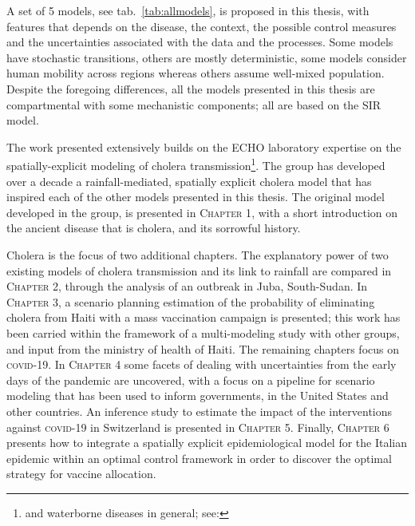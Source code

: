 A set of 5 models, see tab.~\ref{tab:allmodels}, is proposed in this thesis, with features that depends on the disease, the context, the possible control measures and the uncertainties associated with the data and the processes. Some models have stochastic transitions, others are mostly deterministic, some models consider human mobility across regions whereas others assume well-mixed population. Despite the foregoing differences, all the models presented in this thesis are compartmental with some mechanistic components; all are based on the SIR model.

The work presented extensively builds on the ECHO laboratory expertise on the spatially-explicit modeling of cholera transmission\footnote{and waterborne diseases in general; see: }. The group has developed over a decade a rainfall-mediated, spatially explicit cholera model that has inspired each of the other models presented in this thesis. The original model developed in the group, is presented in \textsc{Chapter 1}, with a short introduction on the ancient disease that is cholera, and its sorrowful history.

Cholera is the focus of two additional chapters. The explanatory power of two existing models of cholera transmission and its link to rainfall are compared in \textsc{Chapter 2}, through the analysis of an outbreak in Juba, South-Sudan. In \textsc{Chapter 3}, a scenario planning estimation of the probability of eliminating cholera from Haiti with a mass vaccination campaign is presented; this work has been carried within the framework of a multi-modeling study with other groups, and input from the ministry of health of Haiti.
The remaining chapters focus on \textsc{covid}-19. In \textsc{Chapter 4} some facets of dealing with uncertainties from the early days of the pandemic are uncovered, with a focus on a pipeline for scenario modeling that has been used to inform governments, in the United States and other countries. 
An inference study to estimate the impact of the interventions against \textsc{covid}-19 in Switzerland is presented in \textsc{Chapter 5}.
Finally, \textsc{Chapter 6} presents how to integrate a spatially explicit epidemiological model for the Italian epidemic within an optimal control framework in order to discover the optimal strategy for vaccine allocation.

